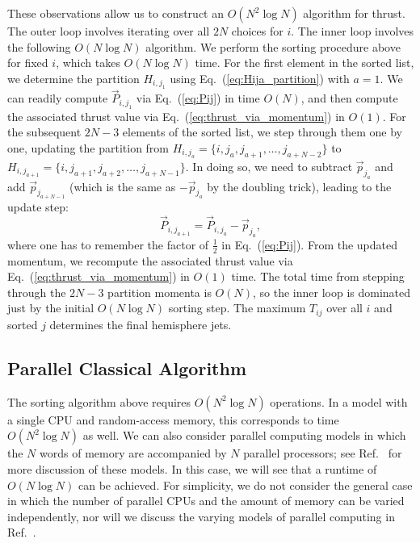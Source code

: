 \documentclass[aps,prd,twocolumn,superscriptaddress,preprintnumbers,nofootinbib,longbibliography,floatfix]{revtex4-1}
\DeclareRobustCommand{\Eq}[1]{Eq.~(\ref{#1})}
\DeclareRobustCommand{\Ref}[1]{Ref.~\cite{#1}}
\newcommand{\jdt}[1]{\textbf{\textcolor{red}{(#1 --jdt)}}}
\begin{document}
These observations allow us to construct an $O(N^2 \log N)$ algorithm for thrust.
%
The outer loop involves iterating over all $2N$ choices for $i$.
%
The inner loop involves the following $O(N\log N)$ algorithm.
%
We perform the sorting procedure above for fixed $i$, which takes $O(N\log N)$ time.
%
For the first element in the sorted list, we determine the partition $H_{i,j_1}$ using \Eq{eq:Hija_partition} with $a =1$.
%
We can readily compute $\vec P_{i,j_1}$ via \Eq{eq:Pij} in time $O(N)$, and then compute the associated thrust value via \Eq{eq:thrust_via_momentum} in $O(1)$.
%
For the subsequent $2N-3$ elements of the sorted list, we step through them one by one, updating the partition from $H_{i,j_a} = \{i,j_a,j_{a+1},\ldots,j_{a+N-2}\}$ to $H_{i,j_{a+1}} = \{i,j_{a+1},j_{a+2},\ldots,j_{a+N-1}\}$.
%
In doing so, we need to subtract $\vec{p}_{j_a}$ and add $\vec{p}_{j_{a+N-1}}$ (which is the same as $-\vec{p}_{j_a}$ by the doubling trick), leading to the update step:
%
\begin{equation}
\label{eq:sweep}
\vec{P}_{i,j_{a+1}} = \vec{P}_{i,j_{a}} - \vec{p}_{j_a},
\end{equation}
%
where one has to remember the factor of $\frac{1}{2}$ in \Eq{eq:Pij}. 
%
From the updated momentum, we recompute the associated thrust value via \Eq{eq:thrust_via_momentum} in $O(1)$ time.
%
The total time from stepping through the $2N-3$ partition momenta is $O(N)$, so the inner loop is dominated just by the initial $O(N\log N)$ sorting step.
%
The maximum $T_{ij}$ over all $i$ and sorted $j$ determines the final hemisphere jets. 
%
%


\subsection{Parallel Classical Algorithm}
\label{subsec:parallel_classical}

The sorting algorithm above requires $O(N^2\log N)$ operations.
%
In a model with a single CPU and random-access memory, this corresponds to
time $O(N^2\log N)$ as well.
%
We can also consider parallel computing models in which the $N$ words of
memory are accompanied by $N$ parallel processors; see \Ref{Vishkin10} for more
discussion of these models.
%
In this case, we will see that a runtime of $O(N\log N)$ can be achieved.
%
For simplicity, we do not consider the general case in which the number of
parallel CPUs and the amount of memory  can be varied independently, nor will we
discuss the varying models of parallel computing in \Ref{Vishkin10}.
\end{document}
